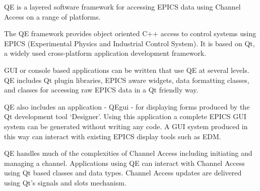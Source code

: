 
\begin{DoxyItemize}
\item QE is a layered software framework for accessing EPICS data using Channel Access on a range of platforms.\par
\par

\end{DoxyItemize}


\begin{DoxyItemize}
\item The QE framework provides object oriented C++ access to control systems using EPICS (Experimental Physics and Industrial Control System). It is based on Qt, a widely used cross-\/platform application development framework.\par
\par

\end{DoxyItemize}


\begin{DoxyItemize}
\item GUI or console based applications can be written that use QE at several levels. QE includes Qt plugin libraries, EPICS aware widgets, data formatting classes, and classes for accessing raw EPICS data in a Qt friendly way.\par
\par

\end{DoxyItemize}


\begin{DoxyItemize}
\item QE also includes an application -\/ QEgui -\/ for displaying forms produced by the Qt development tool ‘Designer’. Using this application a complete EPICS GUI system can be generated without writing any code. A GUI system produced in this way can interact with existing EPICS display tools such as EDM.\par
\par

\end{DoxyItemize}


\begin{DoxyItemize}
\item QE handles much of the complexities of Channel Access including initiating and managing a channel. Applications using QE can interact with Channel Access using Qt based classes and data types. Channel Access updates are delivered using Qt’s signals and slots mechanism.
\end{DoxyItemize}

